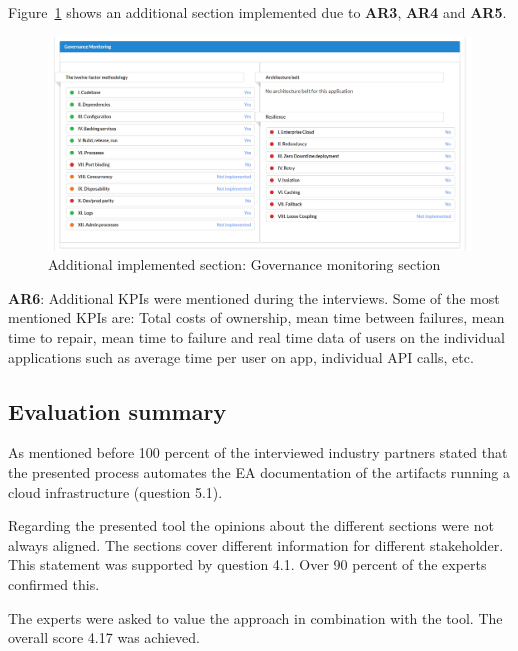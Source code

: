 Figure~\ref{fig:governance-monitoring-section} shows an additional section implemented due to \textbf{AR3}, \textbf{AR4} and \textbf{AR5}.
\begin{figure}[htpb]
  \centering
  \includegraphics[width=1.0\textwidth]{figures/pivio-detailview-governance-monitoring.PNG}
  \caption{Additional implemented section: Governance monitoring section}
  \label{fig:governance-monitoring-section}
\end{figure}

\textbf{AR6}: Additional KPIs were mentioned during the interviews. Some of the most mentioned KPIs are: Total costs of ownership, mean time between failures, mean time to repair, mean time to failure and real time data of users on the individual applications such as average time per user on app, individual API calls, etc.

\subsection{Evaluation summary}

As mentioned before 100 percent of the interviewed industry partners stated that the presented process automates the EA documentation of the artifacts running a cloud infrastructure (question 5.1). 

Regarding the presented tool the opinions about the different sections were not always aligned. The sections cover different information for different stakeholder. This statement was supported by question 4.1. Over 90 percent of the experts confirmed this. 

The experts were asked to value the approach in combination with the tool. The overall score 4.17 was achieved.





